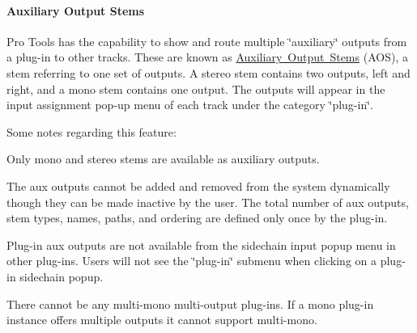 \hypertarget{a00830_subsubsection__auxiliary_output_stems_}{}\paragraph{Auxiliary Output Stems}\label{a00830_subsubsection__auxiliary_output_stems_}
Pro Tools has the capability to show and route multiple \char`\"{}auxiliary\char`\"{} outputs from a plug-\/in to other tracks. These are known as \mbox{\hyperlink{a00809}{Auxiliary Output Stems}} (A\+OS), a stem referring to one set of outputs. A stereo stem contains two outputs, left and right, and a mono stem contains one output. The outputs will appear in the input assignment pop-\/up menu of each track under the category \char`\"{}plug-\/in\char`\"{}.

Some notes regarding this feature\+: 
\begin{DoxyItemize}
\item Only mono and stereo stems are available as auxiliary outputs.  
\item The aux outputs cannot be added and removed from the system dynamically though they can be made inactive by the user. The total number of aux outputs, stem types, names, paths, and ordering are defined only once by the plug-\/in.  
\item Plug-\/in aux outputs are not available from the sidechain input popup menu in other plug-\/ins. Users will not see the \char`\"{}plug-\/in\char`\"{} submenu when clicking on a plug-\/in sidechain popup.  
\item There cannot be any multi-\/mono multi-\/output plug-\/ins. If a mono plug-\/in instance offers multiple outputs it cannot support multi-\/mono.  
\end{DoxyItemize}

